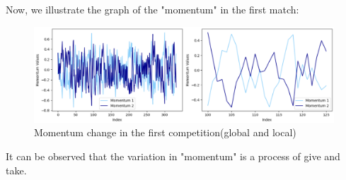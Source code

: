 \documentclass[12pt, a4paper, oneside]{article}
\theoremstyle{break}
\begin{document}
Now, we illustrate the graph of the "momentum" in the first match:


\begin{figure}[H]
    \centering
    \includegraphics[scale=0.65]{imgs/5.png}
    \caption{Momentum change in the first competition(global and local)}
\end{figure}


It can be observed that the variation in "momentum" is a process of give and take.
\end{document}
